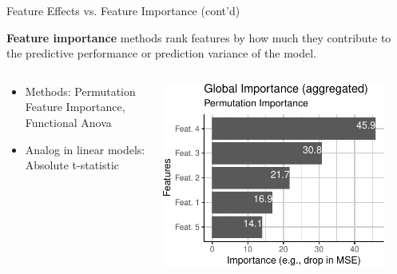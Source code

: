 \documentclass[aspectratio=169]{../latex_main/tntbeamer}  %
\begin{document}
\begin{frame}[c]{Feature Effects vs. Feature Importance (cont'd)}
	
	\textbf{Feature importance} methods rank features by how much they contribute to the predictive performance or prediction variance of the model.
	\begin{columns}
		\begin{column}{0.6\textwidth}
			\begin{itemize}
				\itemsep1em
				\item Methods: Permutation Feature Importance,\\ Functional Anova
				\item Analog in linear models: Absolute t-statistic %
			\end{itemize}
		\end{column}
		\begin{column}{0.4\textwidth}
			\begin{center}
				\includegraphics[page=1, width=0.9\textwidth]{figure/feature-importance}
			\end{center}
		\end{column}
	\end{columns}
\end{frame}
\end{document}
